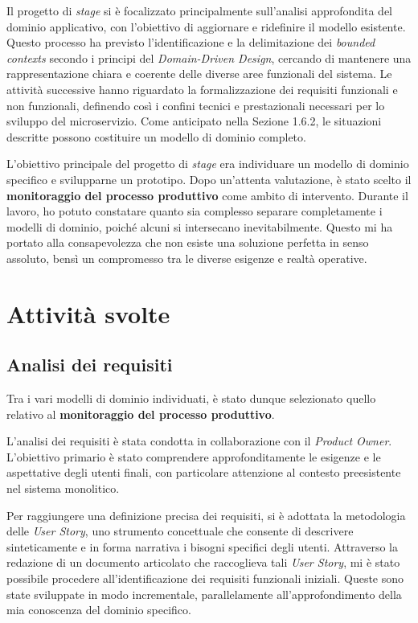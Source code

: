     \vspace{0.2 em}
    \noindent Il progetto di \textit{stage} si è focalizzato principalmente sull'analisi approfondita del dominio applicativo, con l'obiettivo di aggiornare e ridefinire il modello esistente. Questo processo ha previsto l'identificazione e la delimitazione dei \textit{bounded contexts} secondo i principi del \textit{Domain-Driven Design}, cercando di mantenere una rappresentazione chiara e coerente delle diverse aree funzionali del sistema. Le attività successive hanno riguardato la formalizzazione dei requisiti funzionali e non funzionali, definendo così i confini tecnici e prestazionali necessari per lo sviluppo del microservizio. Come anticipato nella Sezione 1.6.2, le situazioni descritte possono costituire un modello di dominio completo.  

    \vspace{0.2 em}
    \noindent L'obiettivo principale del progetto di \textit{stage} era individuare un modello di dominio specifico e svilupparne un prototipo. Dopo un'attenta valutazione, è stato scelto il \textbf{monitoraggio del processo produttivo} come ambito di intervento. Durante il lavoro, ho potuto constatare quanto sia complesso separare completamente i modelli di dominio, poiché alcuni si intersecano inevitabilmente. Questo mi ha portato alla consapevolezza che non esiste una soluzione perfetta in senso assoluto, bensì un compromesso tra le diverse esigenze e realtà operative. 
    
    
    \section{Attività svolte}
        \subsection{Analisi dei requisiti}
        Tra i vari modelli di dominio individuati, è stato dunque selezionato quello relativo al \textbf{monitoraggio del processo produttivo}.

        \vspace{0.2 em}
        \noindent L'analisi dei requisiti è stata condotta in collaborazione con il \textit{Product Owner}. L'obiettivo primario è stato comprendere approfonditamente le esigenze e le aspettative degli utenti finali, con particolare attenzione al contesto preesistente nel sistema monolitico.
        
        \vspace{0.2 em}
        \noindent Per raggiungere una definizione precisa dei requisiti, si è adottata la metodologia delle \textit{User Story}, uno strumento concettuale che consente di descrivere sinteticamente e in forma narrativa i bisogni specifici degli utenti. Attraverso la redazione di un documento articolato che raccoglieva tali \textit{User Story}, mi è stato possibile procedere all'identificazione dei requisiti funzionali iniziali. Queste sono state sviluppate in modo incrementale, parallelamente all'approfondimento della mia conoscenza del dominio specifico.
        
